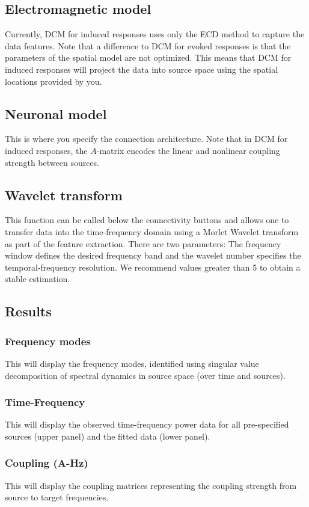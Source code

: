 \subsection{Electromagnetic model}
Currently, DCM for induced responses uses only the ECD method to capture the data features. Note that a difference to DCM for evoked responses is that the parameters of the spatial model are not optimized. This means that DCM for induced responses will project the data into source space using the spatial locations provided by you. 


\subsection{Neuronal model}
This is where you specify the connection architecture. Note that in DCM for induced responses, the $A$-matrix encodes the linear and nonlinear coupling strength between sources.


\subsection{Wavelet transform}
This function can be called below the connectivity buttons and allows one to transfer data into the time-frequency domain using a Morlet Wavelet transform as part of the feature extraction.  There are two parameters: The frequency window defines the desired frequency band and the wavelet number specifies the temporal-frequency resolution. We recommend values greater than 5 to obtain a stable estimation.

\subsection{Results}

\subsubsection{Frequency modes}
This will display the frequency modes, identified using singular value decomposition of spectral dynamics in source space (over time and sources).

\subsubsection{Time-Frequency}
This will display the observed time-frequency power data for all pre-specified sources (upper panel) and the fitted data (lower panel).

\subsubsection{Coupling (A-Hz)}
This will display the coupling matrices representing the coupling strength from source to target frequencies.
